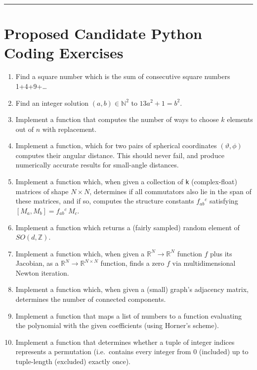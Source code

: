 \documentclass[11pt]{article}
\begin{document}
    \begin{center}\rule{0.5\linewidth}{0.5pt}\end{center}

\hypertarget{proposed-candidate-python-coding-exercises}{%
\section{Proposed Candidate Python Coding
Exercises}\label{proposed-candidate-python-coding-exercises}}

\begin{enumerate}
\def\labelenumi{\arabic{enumi}.}
\item
  Find a square number which is the sum of consecutive square numbers
  1+4+9+\ldots{}
\item
  Find an integer solution \((a, b)\in \mathbb{N}^2\) to
  \(13a^2+1=b^2\).
\item
  Implement a function that computes the number of ways to choose \(k\)
  elements out of \(n\) with replacement.
\item
  Implement a function, which for two pairs of spherical coordinates
  \((\vartheta, \phi)\) computes their angular distance. This should
  never fail, and produce numerically accurate results for small-angle
  distances.
\item
  Implement a function which, when given a collection of \texttt{k}
  (complex-float) matrices of shape \(N\times N\), determines if all
  commutators also lie in the span of these matrices, and if so,
  computes the structure constants \(f_{ab}{}^c\) satisfying
  \([M_a, M_b] = f_{ab}{}^c\, M_c\).
\item
  Implement a function which returns a (fairly sampled) random element
  of \(SO(d, \mathbb{Z})\).
\item
  Implement a function which, when given a
  \(\mathbb{R}^N\to \mathbb{R}^N\) function \(f\) plus its Jacobian, as
  a \(\mathbb{R}^N\to \mathbb{R}^{N\times N}\) function, finds a zero
  \(f\) via multidimensional Newton iteration.
\item
  Implement a function which, when given a (small) graph's adjacency
  matrix, determines the number of connected components.
\item
  Implement a function that maps a list of numbers to a function
  evaluating the polynomial with the given coefficients (using Horner's
  scheme).
\item
  Implement a function that determines whether a tuple of integer
  indices represents a permutation (i.e.~contains every integer from 0
  (included) up to tuple-length (excluded) exactly once).
\end{enumerate}
\end{document}
